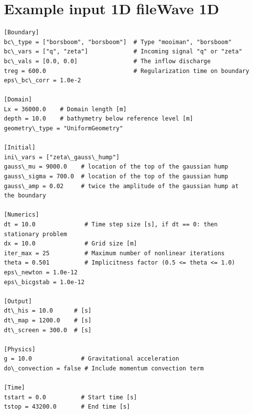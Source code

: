 \documentclass[subfooter, backcover]{mooiman_memo}
\begin{document}
\section{Example input 1D file\newline Wave 1D}
\label{sec:example_input_wave_1d}
\begin{Verbatim}[fontsize=\scriptsize]
[Boundary]
bc\_type = ["borsboom", "borsboom"]  # Type "mooiman", "borsboom"
bc\_vars = ["q", "zeta"]             # Incoming signal "q" or "zeta"
bc\_vals = [0.0, 0.0]                # The inflow discharge
treg = 600.0                         # Regularization time on boundary
eps\_bc\_corr = 1.0e-2

[Domain]
Lx = 36000.0    # Domain length [m]
depth = 10.0    # bathymetry below reference level [m]
geometry\_type = "UniformGeometry"

[Initial]
ini\_vars = ["zeta\_gauss\_hump"]
gauss\_mu = 9000.0    # location of the top of the gaussian hump
gauss\_sigma = 700.0  # location of the top of the gaussian hump
gauss\_amp = 0.02     # twice the amplitude of the gaussian hump at the boundary

[Numerics]
dt = 10.0              # Time step size [s], if dt == 0: then stationary problem
dx = 10.0              # Grid size [m]
iter_max = 25          # Maximum number of nonlinear iterations
theta = 0.501          # Implicitness factor (0.5 <= theta <= 1.0)
eps\_newton = 1.0e-12
eps\_bicgstab = 1.0e-12

[Output]
dt\_his = 10.0      # [s]
dt\_map = 1200.0    # [s]
dt\_screen = 300.0  # [s]

[Physics]
g = 10.0              # Gravitational acceleration
do\_convection = false # Include momentum convection term

[Time]
tstart = 0.0          # Start time [s]
tstop = 43200.0       # End time [s]
\end{Verbatim}
\end{document}
